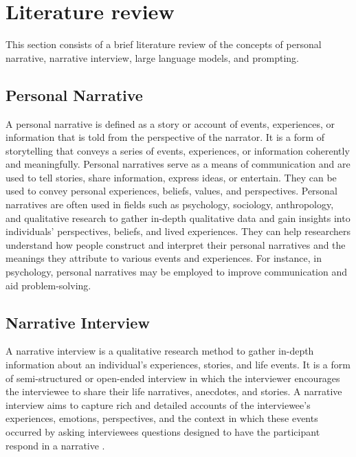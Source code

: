 \chapter{Literature review}
\label{cha:literature_review}
This section consists of a brief literature review of the concepts of personal narrative, narrative interview, large language models, and prompting. 


\section{Personal Narrative}
A personal narrative is defined as a story or account of events, experiences, or information that is told from the perspective of the narrator. It is a form of storytelling that conveys a series of events, experiences, or information coherently and meaningfully. Personal narratives serve as a means of communication and are used to tell stories, share information, express ideas, or entertain. They can be used to convey personal experiences, beliefs, values, and perspectives. Personal narratives are often used in fields such as psychology, sociology, anthropology, and qualitative research to gather in-depth qualitative data and gain insights into individuals' perspectives, beliefs, and lived experiences. They can help researchers understand how people construct and interpret their personal narratives and the meanings they attribute to various events and experiences. For instance, in psychology, personal narratives may be employed to improve communication and aid problem-solving. \cite{personal-narrative-wikipedia,personal-narrative-academic}


\section{Narrative Interview}
A narrative interview is a qualitative research method to gather in-depth information about an individual's experiences, stories, and life events. It is a form of semi-structured or open-ended interview in which the interviewer encourages the interviewee to share their life narratives, anecdotes, and stories. A narrative interview aims to capture rich and detailed accounts of the interviewee's experiences, emotions, perspectives, and the context in which these events occurred by asking interviewees questions designed to have the participant respond in a narrative \cite{Jovchelovitch2000-xs}.

